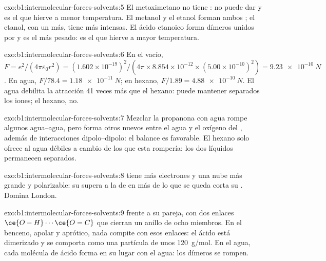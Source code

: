 \begin{solution}{exo:b1:intermolecular-forces-solvents:5}
El metoximetano no tiene : no puede dar  y es
el que hierve a menor temperatura. El metanol y el etanol forman ambos
; el etanol, con un  más, tiene  más intensas. El ácido etanoico forma dímeros unidos por
 y es el más pesado: es el que hierve a mayor
temperatura.
\end{solution}

\begin{solution}{exo:b1:intermolecular-forces-solvents:6}
En el vacío, $F = e^2/(4\pi\varepsilon_0 r^2) = (1.602 \times
10^{-19})^2/(4\pi \times 8.854 \times 10^{-12} \times (5.00 \times
10^{-10})^2) = \qty{9.23e-10}{N}$. En agua, $F/78.4 = \qty{1.18e-11}{N}$;
en hexano, $F/1.89 = \qty{4.88e-10}{N}$. El agua debilita la atracción
41 veces más que el hexano: puede mantener separados los iones; el
hexano, no.
\end{solution}

\begin{solution}{exo:b1:intermolecular-forces-solvents:7}
Mezclar la propanona con agua rompe algunos 
agua--agua, pero forma otros nuevos entre el agua y el oxígeno del
, además de interacciones dipolo--dipolo: el balance es
favorable. El hexano solo ofrece al agua débiles 
a cambio de los  que esta rompería: los dos líquidos
permanecen separados.
\end{solution}

\begin{solution}{exo:b1:intermolecular-forces-solvents:8}
 tiene más electrones y una nube más grande y polarizable: su
 supera a la de  en más de lo que se queda
corta su . Domina London.
\end{solution}

\begin{solution}{exo:b1:intermolecular-forces-solvents:9}
 frente a su pareja, con dos
enlaces $\ce{O-H}\cdots\ce{O=C}$ que cierran un anillo de ocho miembros.
En el benceno, apolar y aprótico, nada compite con esos enlaces: el ácido
está dimerizado y se comporta como una partícula de unos
\qty{120}{g/mol}. En el agua, cada molécula de ácido forma en su lugar
 con el agua: los dímeros se rompen.
\end{solution}

